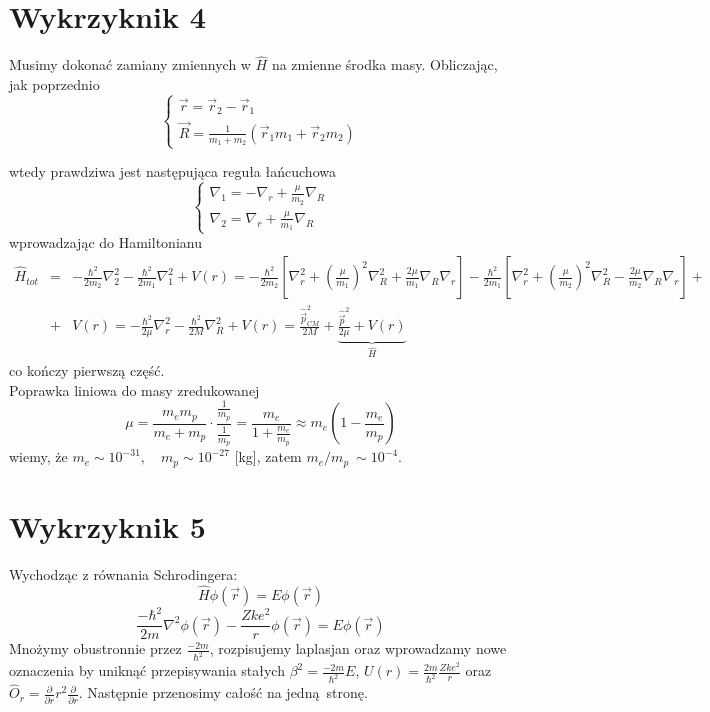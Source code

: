 \documentclass[a4paper,12pt]{article}
\begin{document}
\section{Wykrzyknik 4}
		Musimy dokonać zamiany zmiennych w $\hat{H}$ na zmienne środka masy. Obliczając, jak poprzednio
		$$
		\left\{
			\begin{array}{l}
				\vec{r} = \vec{r}_2-\vec{r}_1\\
				\vec{R} = \frac{1}{m_1 + m_2}\left(\vec{r}_1 m_1 + \vec{r}_2 m_2\right)
			\end{array}
		\right.
	$$

		wtedy prawdziwa jest następująca reguła łańcuchowa 
		$$
		\left\{
			\begin{array}{l}
				\nabla_1 = -\nabla_r + \frac{\mu}{m_2}\nabla_R \\
				\nabla_2 = \nabla_r + \frac{\mu}{m_1}\nabla_R 
			\end{array}
		\right.
		$$
		wprowadzając do Hamiltonianu
		$$
		\begin{array}{lll}
			\hat{H}_{tot} &=& -\frac{\hbar^2}{2m_2}\nabla_2^2 - \frac{\hbar^2}{2m_1}\nabla_1^2 + V(r) = -\frac{\hbar^2}{2m_2}\left[\nabla_r^2+\left(\frac{\mu}{m_1}\right)^2\nabla_R^2
			+\frac{2\mu}{m_1}\nabla_R\nabla_r \right] -\frac{\hbar^2}{2m_1}\left[\nabla_r^2+\left(\frac{\mu}{m_2}\right)^2\nabla_R^2
			-\frac{2\mu}{m_2}\nabla_R\nabla_r \right] + \\
			&+& V(r) = -\frac{\hbar^2}{2\mu}\nabla_r^2-\frac{\hbar^2}{2M}\nabla_R^2 + V(r) = \frac{\hat{\vec{p}}_{CM}^2}{2M} + \underbrace{\frac{\hat{\vec{p}}^2}{2\mu} +  V(r)}_{\hat{H}}
		\end{array}
		$$
		co kończy pierwszą część.\\
		Poprawka liniowa do masy zredukowanej
		$$
			\mu = \frac{m_em_p}{m_e+m_p} \cdot \frac{\frac{1}{m_p}}{\frac{1}{m_p}} = \frac{m_e}{1+\frac{m_e}{m_p}} \approx m_e \left(1-\frac{m_e}{m_p}\right)
		$$
		wiemy, że $m_e \sim 10^{-31},\quad m_p \sim 10^{-27}$ [kg], zatem $m_e/m_p ~\sim 10^{-4}$.

\section{Wykrzyknik 5}
Wychodząc z równania Schrodingera:
\[
  \hat{H} \phi(\vec{r})  = E \phi (\vec{r})
\]
\[
  \frac{-\hbar^2}{2m}\nabla^2 \phi (\vec{r}) - \frac{Zke^2}{r}\phi (\vec{r}) = E
\phi (\vec{r})
\]
Mnożymy obustronnie przez $\frac{-2m}{\hbar^2}$, rozpisujemy laplasjan oraz
wprowadzamy nowe oznaczenia by uniknąć przepisywania stałych $\beta^2 =
\frac{-2m}{\hbar^2}E$, $U(r) = \frac{2m}{\hbar^2}\frac{Zke^2}{r}$ oraz
$\hat{O}_r = \frac{\partial}{\partial r}r^2 \frac{\partial}{\partial r}$.
Następnie przenosimy całość na jedną stronę.
\end{document}

